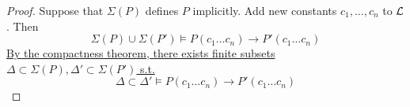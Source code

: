 \documentclass[11pt]{article}
\begin{document}
\begin{proof}
Suppose that \(\Sigma(P)\) defines \(P\) implicitly. Add new constants
\(c_1,\dots,c_n\) to \(\mathcal{L}\). Then
\begin{equation*}
\Sigma(P)\cup\Sigma(P')\models P(c_1\dots c_n)\to P'(c_1\dots c_n)
\end{equation*}
\uline{By the compactness theorem, there exists finite subsets}
\uline{\(\Delta\subset\Sigma(P),\Delta'\subset\Sigma(P')\) s.t.}
\begin{equation*}
\Delta\subset\Delta'\models P(c_1\dots c_n)\to P'(c_1\dots c_n)
\end{equation*}
\end{proof}
\end{document}
